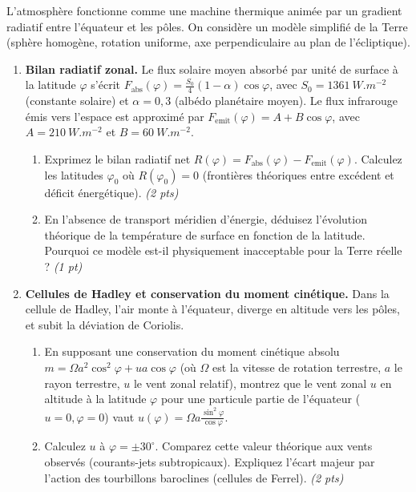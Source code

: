 \documentclass[11pt]{article}
\begin{document}
\begin{exercice}
\label{exo:circulation_atmo}
L'atmosphère fonctionne comme une machine thermique animée par un gradient radiatif entre l'équateur et les pôles. On considère un modèle simplifié de la Terre (sphère homogène, rotation uniforme, axe perpendiculaire au plan de l'écliptique).

\begin{enumerate}
    \item \textbf{Bilan radiatif zonal.} Le flux solaire moyen absorbé par unité de surface à la latitude $\varphi$ s'écrit $F_{\text{abs}}(\varphi) = \frac{S_0}{4}(1-\alpha)\cos\varphi$, avec $S_0 = \SI{1361}{W.m^{-2}}$ (constante solaire) et $\alpha = 0,3$ (albédo planétaire moyen). Le flux infrarouge émis vers l'espace est approximé par $F_{\text{emit}}(\varphi) = A + B\cos\varphi$, avec $A = \SI{210}{W.m^{-2}}$ et $B = \SI{60}{W.m^{-2}}$.
    \begin{enumerate}
        \item Exprimez le bilan radiatif net $R(\varphi) = F_{\text{abs}}(\varphi) - F_{\text{emit}}(\varphi)$. Calculez les latitudes $\varphi_0$ où $R(\varphi_0)=0$ (frontières théoriques entre excédent et déficit énergétique). \textit{(2 pts)}
        \item En l'absence de transport méridien d'énergie, déduisez l'évolution théorique de la température de surface en fonction de la latitude. Pourquoi ce modèle est-il physiquement inacceptable pour la Terre réelle ? \textit{(1 pt)}
    \end{enumerate}

    \item \textbf{Cellules de Hadley et conservation du moment cinétique.} Dans la cellule de Hadley, l'air monte à l'équateur, diverge en altitude vers les pôles, et subit la déviation de Coriolis.
    \begin{enumerate}
        \item En supposant une conservation du moment cinétique absolu $m = \Omega a^2 \cos^2\varphi + u a \cos\varphi$ (où $\Omega$ est la vitesse de rotation terrestre, $a$ le rayon terrestre, $u$ le vent zonal relatif), montrez que le vent zonal $u$ en altitude à la latitude $\varphi$ pour une particule partie de l'équateur ($u=0, \varphi=0$) vaut $u(\varphi) = \Omega a \frac{\sin^2\varphi}{\cos\varphi}$.
        \item Calculez $u$ à $\varphi = \pm 30^\circ$. Comparez cette valeur théorique aux vents observés (courants-jets subtropicaux). Expliquez l'écart majeur par l'action des tourbillons baroclines (cellules de Ferrel). \textit{(2 pts)}
    \end{enumerate}


\end{enumerate}
\end{exercice}
\end{document}
